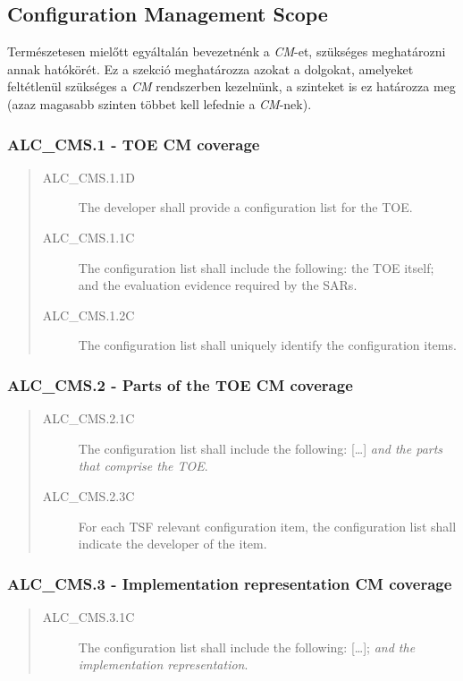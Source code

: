 \subsection{Configuration Management Scope}
Természetesen mielőtt egyáltalán bevezetnénk a \emph{CM}-et, szükséges meghatározni annak hatókörét.
Ez a szekció meghatározza azokat a dolgokat, amelyeket feltétlenül szükséges a \emph{CM} rendszerben
kezelnünk, a szinteket is ez határozza meg (azaz magasabb szinten többet kell lefednie
a \emph{CM}-nek).

\pagebreak[3]
\subsubsection{ALC\_CMS.1 - TOE CM coverage}
\begin{quote}
    \begin{description}
        \item[ALC\_CMS.1.1D]{The developer shall provide a configuration list for the TOE.}
        \item[ALC\_CMS.1.1C]{The configuration list shall include the following: the TOE itself; and
            the evaluation evidence required by the SARs.}
        \item[ALC\_CMS.1.2C]{The configuration list shall uniquely identify the configuration
            items.}
    \end{description}
\end{quote}

\pagebreak[3]
\subsubsection{ALC\_CMS.2 - Parts of the TOE CM coverage}
\begin{quote}
    \begin{description}
        \item[ALC\_CMS.2.1C]{The configuration list shall include the following: [\ldots] \emph{and
            the parts that comprise the TOE}.}
        \item[ALC\_CMS.2.3C]{For each TSF relevant configuration item, the configuration list shall
            indicate the developer of the item.}
    \end{description}
\end{quote}

\pagebreak[3]
\subsubsection{ALC\_CMS.3 - Implementation representation CM coverage}
\begin{quote}
    \begin{description}
        \item[ALC\_CMS.3.1C]{The configuration list shall include the following: [\ldots];
            \emph{and the implementation representation}.}
    \end{description}
\end{quote}

